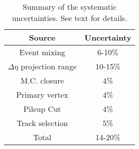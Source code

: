 \begin{table}[!h]
\centering
\caption{ Summary of the systematic uncertainties. See text for details.}
\begin{tabular}{ c|c }
\hline
Source &  Uncertainty \\ \hline
Event mixing & 6-10\% \\  \hline
$\Delta\eta$ projection range & 10-15\% \\ \hline
M.C. closure & 4\% \\ \hline
Primary vertex & 4\% \\ \hline
Pileup Cut & 4\% \\ \hline
Track selection & 5\% \\ \hline
Total & 14-20\% \\
\hline
\end{tabular}
\end{table}



